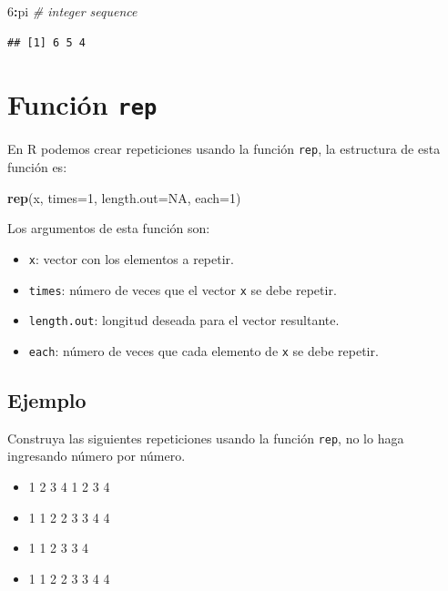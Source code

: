 \documentclass[10pt,]{krantz}
\makeatletter
\newenvironment{Shaded}{\begin{snugshade}}{\end{snugshade}}
\newcommand{\KeywordTok}[1]{\textcolor[rgb]{0.13,0.29,0.53}{\textbf{#1}}}
\newcommand{\DataTypeTok}[1]{\textcolor[rgb]{0.13,0.29,0.53}{#1}}
\newcommand{\DecValTok}[1]{\textcolor[rgb]{0.00,0.00,0.81}{#1}}
\newcommand{\CommentTok}[1]{\textcolor[rgb]{0.56,0.35,0.01}{\textit{#1}}}
\newcommand{\OtherTok}[1]{\textcolor[rgb]{0.56,0.35,0.01}{#1}}
\newcommand{\OperatorTok}[1]{\textcolor[rgb]{0.81,0.36,0.00}{\textbf{#1}}}
\newcommand{\NormalTok}[1]{#1}
\providecommand{\tightlist}{%
  \setlength{\itemsep}{0pt}\setlength{\parskip}{0pt}}
\let\proglang=\textsf
\newenvironment{kframe}{%
\medskip{}
\setlength{\fboxsep}{.8em}
 \def\at@end@of@kframe{}%
 \ifinner\ifhmode%
  \def\at@end@of@kframe{\end{minipage}}%
  \begin{minipage}{\columnwidth}%
 \fi\fi%
 \def\FrameCommand##1{\hskip\@totalleftmargin \hskip-\fboxsep
 \colorbox{shadecolor}{##1}\hskip-\fboxsep
     \hskip-\linewidth \hskip-\@totalleftmargin \hskip\columnwidth}%
 \MakeFramed {\advance\hsize-\width
   \@totalleftmargin\z@ \linewidth\hsize
   \@setminipage}}%
 {\par\unskip\endMakeFramed%
 \at@end@of@kframe}
\renewenvironment{Shaded}{\begin{kframe}}{\end{kframe}}
\makeatother
\begin{document}
\begin{Shaded}
\begin{Highlighting}[]
\DecValTok{6}\OperatorTok{:}\NormalTok{pi  }\CommentTok{# integer sequence}
\end{Highlighting}
\end{Shaded}

\begin{verbatim}
## [1] 6 5 4
\end{verbatim}

\section{\texorpdfstring{Función \texttt{rep} 
}{Función rep  }}\label{funcion-rep}

En \proglang{R} podemos crear repeticiones usando la función
\texttt{rep}, la estructura de esta función es:

\begin{Shaded}
\begin{Highlighting}[]
\KeywordTok{rep}\NormalTok{(x, }\DataTypeTok{times=}\DecValTok{1}\NormalTok{, }\DataTypeTok{length.out=}\OtherTok{NA}\NormalTok{, }\DataTypeTok{each=}\DecValTok{1}\NormalTok{)}
\end{Highlighting}
\end{Shaded}

Los argumentos de esta función son:

\begin{itemize}
\tightlist
\item
  \texttt{x}: vector con los elementos a repetir.
\item
  \texttt{times}: número de veces que el vector \texttt{x} se debe
  repetir.
\item
  \texttt{length.out}: longitud deseada para el vector resultante.
\item
  \texttt{each}: número de veces que cada elemento de \texttt{x} se debe
  repetir.
\end{itemize}

\subsection*{Ejemplo}\label{ejemplo-11}


Construya las siguientes repeticiones usando la función \texttt{rep}, no
lo haga ingresando número por número.

\begin{itemize}
\tightlist
\item
  1 2 3 4 1 2 3 4
\item
  1 1 2 2 3 3 4 4
\item
  1 1 2 3 3 4
\item
  1 1 2 2 3 3 4 4
\end{itemize}
\end{document}
